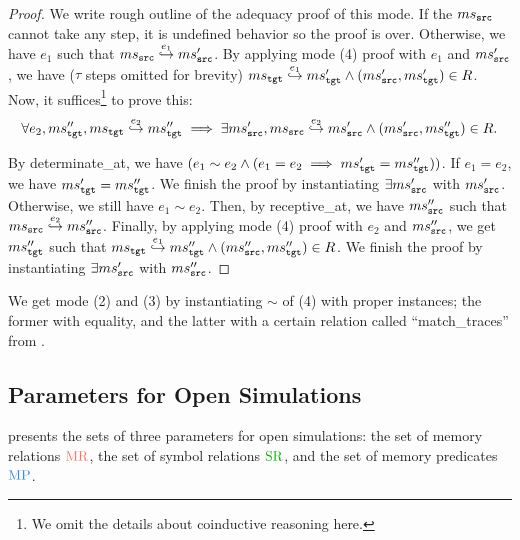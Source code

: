 \begin{proof}
We write rough outline of the adequacy proof of this mode.
If the $ms{}_{\texttt{src}{}}$ cannot take any step, it is undefined behavior so the proof is over. Otherwise, we have $e_1$ such that $ms{}_{\texttt{src}{}} \stackrel{e_1}{\hookrightarrow} ms{}_{\texttt{src}{}}'$.
By applying mode (4) proof with $e_1$ and $ms{}_{\texttt{src}{}}'$, we have ($\tau$ steps omitted for brevity) $ms{}_{\texttt{tgt}{}} \stackrel{e_1}{\hookrightarrow} ms{}_{\texttt{tgt}{}}' \land (ms{}_{\texttt{src}{}}', ms{}_{\texttt{tgt}{}}') \in R$. Now, it suffices\footnote{We omit the details about coinductive reasoning here.} to prove this:
\[\forall e_2, ms{}_{\texttt{tgt}{}}'', ms{}_{\texttt{tgt}{}} \stackrel{e_2}{\hookrightarrow} ms{}_{\texttt{tgt}{}}'' \implies \exists ms{}_{\texttt{src}{}}', ms{}_{\texttt{src}{}} \stackrel{e_2}{\hookrightarrow} ms{}_{\texttt{src}{}}' \land (ms{}_{\texttt{src}{}}', ms{}_{\texttt{tgt}{}}'') \in R.\]

By determinate\_at, we have $(e_1 \sim e_2 \land (e_1 = e_2 \implies ms{}_{\texttt{tgt}{}}' = ms{}_{\texttt{tgt}{}}''))$.
If $e_1 = e_2$, we have $ms{}_{\texttt{tgt}{}}' = ms{}_{\texttt{tgt}{}}''$. We finish the proof by instantiating $\exists ms{}_{\texttt{src}{}}'$ with $ms{}_{\texttt{src}{}}'$.
Otherwise, we still have $e_1 \sim e_2$.
Then, by receptive\_at, we have $ms{}_{\texttt{src}{}}''$ such that $ms{}_{\texttt{src}{}} \stackrel{e_2}{\hookrightarrow} ms{}_{\texttt{src}{}}''$.
Finally, by applying mode (4) proof with $e_2$ and $ms{}_{\texttt{src}{}}''$, we get $ms{}_{\texttt{tgt}{}}''$ such that $ms{}_{\texttt{tgt}{}} \stackrel{e_1}{\hookrightarrow} ms{}_{\texttt{tgt}{}}'' \land (ms{}_{\texttt{src}{}}'', ms{}_{\texttt{tgt}{}}'') \in R$.
We finish the proof by instantiating $\exists ms{}_{\texttt{src}{}}'$ with $ms{}_{\texttt{src}{}}''$.

\end{proof}

We get mode (2) and (3) by instantiating $\sim$ of (4) with proper instances; the former with equality, and the latter with a certain relation called ``match\_traces'' from \cc{}.

\subsection{Parameters for Open Simulations}
\label{sec:main-verification:parameter}

 presents
the sets of three parameters for open simulations:
the set of memory relations $\MREL$, the set of symbol relations $\SREL$, and the set of memory predicates $\MPRED$.

